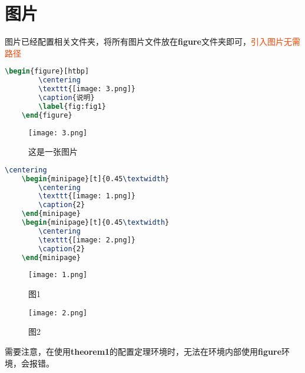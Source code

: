 \documentclass[12pt, a4paper, oneside, UTF8]{ctexbook}
\begin{document}
\else
\fi

\chapter{图片}

图片已经配置相关文件夹，将所有图片文件放在\textbf{figure}文件夹即可，\textcolor{OrangeRed}{引入图片无需路径}

\begin{lstlisting}[language=TeX]
    \begin{figure}[htbp]
        \centering
        \texttt{[image: 3.png]}
        \caption{说明}
        \label{fig:fig1}
    \end{figure}
\end{lstlisting}

\begin{figure}[htbp]
    \centering
    \texttt{[image: 3.png]}
    \caption{这是一张图片}
    \label{fig:fig1}
\end{figure}


\begin{lstlisting}[language=TeX]
    \centering
    \begin{minipage}[t]{0.45\textwidth}
        \centering
        \texttt{[image: 1.png]}
        \caption{2}
    \end{minipage}
    \begin{minipage}[t]{0.45\textwidth}
        \centering
        \texttt{[image: 2.png]}
        \caption{2}
    \end{minipage}
\end{lstlisting}

\begin{figure}[htbp]
    \centering
    \begin{minipage}[t]{0.48\textwidth}
        \centering
        \texttt{[image: 1.png]}
        \caption{图1}
    \end{minipage}
    \begin{minipage}[t]{0.48\textwidth}
        \centering
        \texttt{[image: 2.png]}
        \caption{图2}
    \end{minipage}
\end{figure}

\begin{remark}
    需要注意，在使用\textbf{theorem1}的配置定理环境时，无法在环境内部使用\textbf{figure}环境，会报错。
\end{remark}

\ifx\allfiles\undefined
\end{document}
